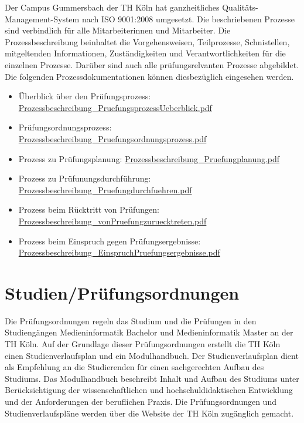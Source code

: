 Der Campus Gummersbach der TH Köln hat ganzheitliches
Qualitäts-Management-System nach ISO 9001:2008 umgesetzt. Die
beschriebenen Prozesse sind verbindlich für alle Mitarbeiterinnen und
Mitarbeiter. Die Prozessbeschreibung beinhaltet die Vorgehensweisen,
Teilprozesse, Schnistellen, mitgeltenden Informationen, Zuständigkeiten
und Verantwortlichkeiten für die einzelnen Prozesse. Darüber sind auch
alle prüfungsrelvanten Prozesse abgebildet. Die folgenden
Prozessdokumentationen können diesbezüglich eingesehen werden.

\begin{itemize}
\tightlist
\item
  Überblick über den Prüfungsprozess:
  \href{../anhaenge/Prozessbeschreibung_PruefungsprozessUeberblick.pdf}{Prozessbeschreibung\_PruefungsprozessUeberblick.pdf}
\item
  Prüfungsordnungsprozess:
  \href{../anhaenge/Prozessbeschreibung_Pruefungsordnungsprozess.pdf}{Prozessbeschreibung\_Pruefungsordnungsprozess.pdf}
\item
  Prozess zu Prüfungsplanung:
  \href{../anhaenge/Prozessbeschreibung_Pruefungplanung.pdf}{Prozessbeschreibung\_Pruefungplanung.pdf}
\item
  Prozess zu Prüfunungsdurchführung:
  \href{../anhaenge/Prozessbeschreibung_Pruefungdurchfuehren.pdf}{Prozessbeschreibung\_Pruefungdurchfuehren.pdf}
\item
  Prozess beim Rücktritt von Prüfungen:
  \href{../anhaenge/Prozessbeschreibung_vonPruefungzuruecktreten.pdf}{Prozessbeschreibung\_vonPruefungzuruecktreten.pdf}
\item
  Prozess beim Einspruch gegen Prüfungsergebnisse:
  \href{../anhaenge/Prozessbeschreibung_EinspruchPruefungsergebnisse.pdf}{Prozessbeschreibung\_EinspruchPruefungsergebnisse.pdf}
\end{itemize}

\section{Studien/Prüfungsordnungen}\label{studienpruxfcfungsordnungen-1}

Die Prüfungsordnungen regeln das Studium und die Prüfungen in den
Studiengängen Medieninformatik Bachelor und Medieninformatik Master an
der TH Köln. Auf der Grundlage dieser Prüfungsordnungen erstellt die TH
Köln einen Studienverlaufsplan und ein Modulhandbuch. Der
Studienverlaufsplan dient als Empfehlung an die Studierenden für einen
sachgerechten Aufbau des Studiums. Das Modulhandbuch beschreibt Inhalt
und Aufbau des Studiums unter Berücksichtigung der wissenschaftlichen
und hochschuldidaktischen Entwicklung und der Anforderungen der
beruflichen Praxis. Die Prüfungsordnungen und Studienverlaufspläne
werden über die Website der TH Köln zugänglich gemacht.

